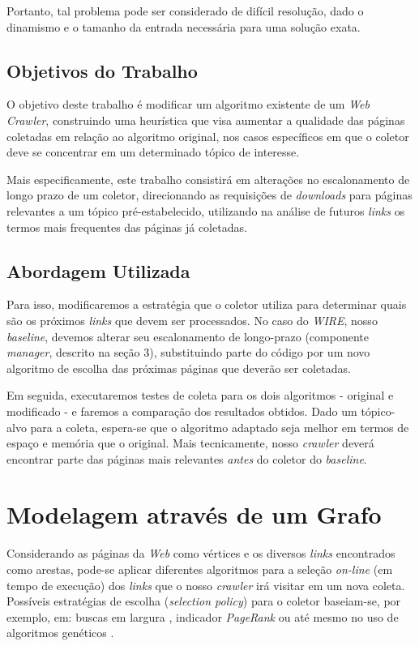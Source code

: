 \documentclass[a4paper,12pt,titlepage]{article}
\begin{document}
Portanto, tal problema pode ser considerado de difícil resolução, dado o dinamismo e o tamanho da entrada necessária para uma solução exata.

\subsection{Objetivos do Trabalho}

O objetivo deste trabalho é modificar um algoritmo existente de um \textit{Web Crawler}, construindo uma heurística que visa aumentar a qualidade das páginas coletadas em relação ao algoritmo original, nos casos específicos em que o coletor deve se concentrar em um determinado tópico de interesse.

Mais especificamente, este trabalho consistirá em alterações no escalonamento de longo prazo de um coletor, direcionando as requisições de \textit{downloads} para páginas relevantes a um tópico pré-estabelecido, utilizando na análise de futuros \textit{links} os termos mais frequentes das páginas já coletadas.


\subsection{Abordagem Utilizada}

Para isso, modificaremos a estratégia que o coletor utiliza para determinar quais são os próximos \textit{links} que devem ser processados. No caso do \textit{WIRE}, nosso \textit{baseline}, devemos alterar seu escalonamento de longo-prazo (componente \textit{manager}, descrito na seção 3), substituindo parte do código por um novo algoritmo de escolha das próximas páginas que deverão ser coletadas.

Em seguida, executaremos testes de coleta para os dois algoritmos - original e modificado - e faremos a comparação dos resultados obtidos. Dado um tópico-alvo para a coleta, espera-se que o algoritmo adaptado seja melhor em termos de espaço e memória que o original. Mais tecnicamente, nosso \textit{crawler} deverá encontrar parte das páginas mais relevantes \textit{antes} do coletor do \textit{baseline}. 

\section{Modelagem através de um Grafo}

Considerando as páginas da \textit{Web} como vértices e os diversos \textit{links} encontrados como arestas, pode-se aplicar diferentes algoritmos para a seleção \textit{on-line} (em tempo de execução) dos \textit{links} que o nosso \textit{crawler} irá visitar em um nova coleta. Possíveis estratégias de escolha (\textit{selection policy}) para o coletor baseiam-se, por exemplo, em: buscas em largura \cite{najork}, indicador \textit{PageRank} \cite{cho} ou até mesmo no uso de algoritmos genéticos \cite{johnson}. 
\end{document}
